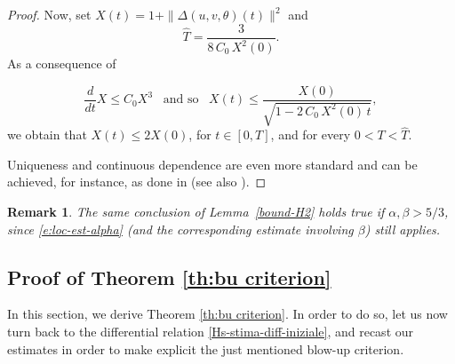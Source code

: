\documentclass[a4paper]{article}
\newtheorem{remark}[thm]{Remark}
\begin{document}
\begin{proof}
  Now, set $X(t) = 1 + \|\Delta (u, v, \theta) (t) \|^2$ and
  \begin{equation*}
    \hat T = \frac{3}{8\,C_0\,X^2(0)}.
  \end{equation*}
  As a consequence of
   
    \begin{equation*}
      \frac{d}{dt} X\leq C_0 X^3\,\,\, \textrm{ and so } \,\,\,
      X(t)\leq \frac{X(0)}{\sqrt{1-2\,C_0\,X^2(0)\, t}},
    \end{equation*}
    we obtain that $X(t)\leq 2 X(0)$, for $t \in [0,T]$, and for
    every $0<T<\hat T$.

 {Uniqueness and continuous dependence are even more standard and can be achieved, for instance, as done
  in \cite{Yuan-Chen} (see also \cite{Yuan-Zhang})}.
\end{proof}

\begin{remark}
    The same conclusion of Lemma~\ref{bound-H2} holds true if $\alpha,
\beta > 5/3$, since \eqref{e:loc-est-alpha} (and the corresponding
estimate involving $\beta$) still applies.
  \end{remark}

  \subsection{Proof of Theorem \ref{th:bu criterion}}
  In this section, we derive Theorem \ref{th:bu criterion}. In
order to do so, let us now turn back to the differential relation
\eqref{Hs-stima-diff-iniziale}, and recast our estimates in order to
make explicit the just mentioned blow-up criterion.
  
\end{document}
